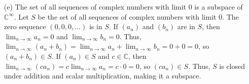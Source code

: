 \begin{solution}
\begin{enumerate}
        \item[(e)] The set of all sequences of complex numbers with limit \( 0 \) is a subspace of \( \mathbb{C}^{\infty} \). Let \( S \) be the set of all sequences of complex numbers with limit \( 0 \). The zero sequence \( (0, 0, 0, \ldots) \) is in \( S \). If \( (a_n) \) and \( (b_n) \) are in \( S \), then \( \lim_{n \to \infty} a_n = 0 \) and \( \lim_{n \to \infty} b_n = 0 \). Thus, \( \lim_{n \to \infty} (a_n + b_n) = \lim_{n \to \infty} a_n + \lim_{n \to \infty} b_n = 0 + 0 = 0 \), so \( (a_n + b_n) \in S \). If \( (a_n) \in S \) and \( c \in \mathbb{C} \), then \( \lim_{n \to \infty} (c a_n) = c \lim_{n \to \infty} a_n = c \cdot 0 = 0 \), so \( (c a_n) \in S \). Thus, \( S \) is closed under addition and scalar multiplication, making it a subspace.
    \end{enumerate}
\end{solution}

